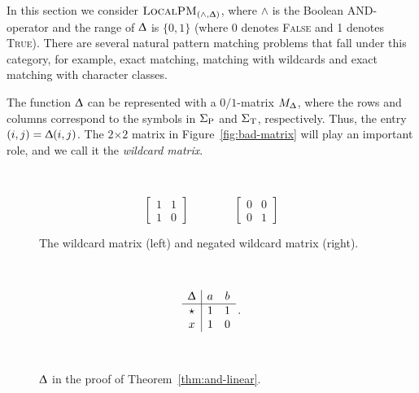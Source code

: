 \documentclass{article}
\renewcommand{\Delta}{\Updelta}
\newcommand{\TRUE}{\textsc{True}\xspace}
\newcommand{\FALSE}{\textsc{False}\xspace}
\newcommand{\SigmaP}{\ensuremath{\Sigma_{\textup{P}}}}
\newcommand{\SigmaT}{\ensuremath{\Sigma_{\textup{T}}}}
\newcommand{\local}{\ensuremath{\textsc{LocalPM}}}
\newcommand{\wildcard}{\ensuremath{\star}}
\theoremstyle{plain}
\theoremstyle{definition}
\begin{document}
In this section we consider $\local_{(\wedge,\Delta)}$, where $\wedge$ is the Boolean AND-operator and the range of $\Delta$ is $\{0,1\}$ (where 0 denotes \FALSE and 1 denotes \TRUE). There are several natural pattern matching problems that fall under this category, for example, exact matching, matching with wildcards and exact matching with character classes.

The function $\Delta$ can be represented with a $0/1$-matrix $M_{\Delta}$, where the rows and columns correspond to the symbols in $\SigmaP$ and $\SigmaT$, respectively. Thus, the entry $(i,j)=\Delta(i,j)$. The $2$$\times$$2$ matrix in Figure~\ref{fig:bad-matrix} will play an important role, and we call it the \emph{wildcard matrix}.

\begin{figure}[t]
    ~
    \hfill
    \begin{minipage}[b]{0.5\linewidth}
        \begin{equation*}
            \left[
            \begin{array}{cc}
                1 & 1\\
                1 & 0
            \end{array}
            \right]
\qquad \qquad
\left[
            \begin{array}{cc}
                0 & 0\\
                0 & 1
            \end{array}
            \right]
        \end{equation*}
        \vspace{1pt}
        \caption{\label{fig:bad-matrix}The wildcard matrix (left) and negated wildcard matrix (right).}
    \end{minipage}
    ~
    \hfill
    ~
    \begin{minipage}[b]{0.3\linewidth}
         \begin{equation*}
             \begin{array}{c|cc}
                 \Delta & a & b\\
                 \hline \wildcard & 1 & 1\\
                 x & 1 & 0
             \end{array}\,.
         \end{equation*}

         \caption{\label{fig:and-linear}$\Delta$ in the proof of Theorem~\ref{thm:and-linear}.\\~}
          \vspace{-18.25pt}
    \end{minipage}
    \hfill
    ~
\end{figure}
\end{document}
